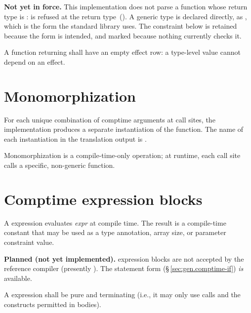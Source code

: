 \begin{note}
  \textbf{Not yet in force.}  This implementation does not parse a function whose return type
  is :  is refused at the return
  type~().  A generic type is declared directly, as
  , which is the form the standard library uses.  The
  constraint below is retained because the form is intended, and marked because nothing
  currently checks it.
\end{note}

\begin{constraint}
  A function returning  shall have an empty effect row: a type-level
  value cannot depend on an effect.
\end{constraint}

\section{Monomorphization}
\label{sec:gen.monomorphization}

\pnum
For each unique combination of comptime arguments at call sites, the
implementation produces a separate instantiation of the function.  The
name of each instantiation in the translation output is
.

\pnum
Monomorphization is a compile-time-only operation; at runtime, each
call site calls a specific, non-generic function.

\section{Comptime expression blocks}
\label{sec:gen.comptime-block}

\pnum
A  expression evaluates \textit{expr} at compile
time.  The result is a compile-time constant that may be used as a type
annotation, array size, or parameter constraint value.

\begin{note}
  \textbf{Planned (not yet implemented).}   expression
  blocks are not accepted by the reference compiler (presently
  ).  The statement form 
  (\S\,\ref{sec:gen.comptime-if}) \emph{is} available.
\end{note}

\begin{constraint}
  A  expression shall be pure and terminating (i.e., it may
  only use  calls and the constructs permitted in 
  bodies).
\end{constraint}

